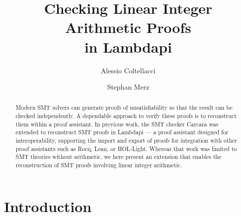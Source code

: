 \documentclass[runningheads,envcountsame]{llncs}
\begin{document}
\title{Checking Linear Integer Arithmetic Proofs\\ in Lambdapi}


\author{Alessio Coltellacci
  \and
  Stephan Merz
}
%
%

%
\maketitle
%
\begin{abstract}
Modern SMT solvers can generate proofs of unsatisfiability so that the result can be checked independently.
A dependable approach to verify these proofs is to reconstruct them within a proof assistant.
In previous work, the SMT checker Carcara was extended to reconstruct SMT proofs in Lambdapi — a proof assistant designed for interoperability,
supporting the import and export of proofs for integration with other proof assistants such as Rocq, Lean, or HOL-Light.
Whereas that work was limited to SMT theories without arithmetic, we here present an extension that enables the reconstruction of SMT proofs involving linear integer arithmetic.

\end{abstract}

\section{Introduction}
\end{document}
